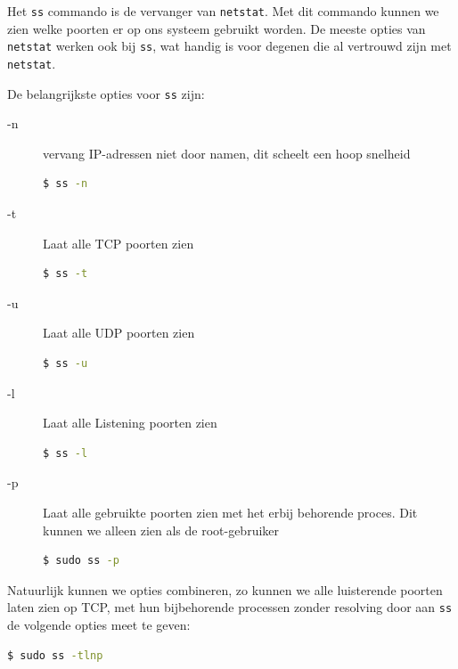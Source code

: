 Het \texttt{ss} commando is de vervanger van \texttt{netstat}. Met dit commando kunnen we zien welke poorten er op ons systeem gebruikt worden. De meeste opties van \texttt{netstat} werken ook bij \texttt{ss}, wat handig is voor degenen die al vertrouwd zijn met \texttt{netstat}.

De belangrijkste opties voor \texttt{ss} zijn:
\begin{description}
\item[-n] vervang IP-adressen niet door namen, dit scheelt een hoop snelheid
\begin{lstlisting}[language=bash]
$ ss -n
\end{lstlisting}

\item[-t] Laat alle TCP poorten zien
\begin{lstlisting}[language=bash]
$ ss -t
\end{lstlisting}

\item[-u] Laat alle UDP poorten zien
\begin{lstlisting}[language=bash]
$ ss -u
\end{lstlisting}

\item[-l] Laat alle Listening poorten zien
\begin{lstlisting}[language=bash]
$ ss -l
\end{lstlisting}

\item[-p] Laat alle gebruikte poorten zien met het erbij behorende proces. Dit kunnen we alleen zien als de root-gebruiker
\begin{lstlisting}[language=bash]
$ sudo ss -p
\end{lstlisting}

\end{description}

Natuurlijk kunnen we opties combineren, zo kunnen we alle luisterende poorten laten zien op TCP, met hun bijbehorende processen zonder resolving door aan \texttt{ss} de volgende opties meet te geven:
\begin{lstlisting}[language=bash]
$ sudo ss -tlnp
\end{lstlisting}

